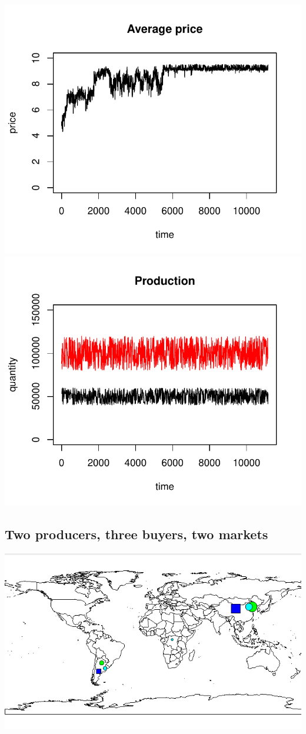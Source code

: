 \documentclass{article}
\begin{document}
\noindent
\vskip-5mm
\hskip-1cm
\includegraphics[scale=0.5]{fig_case07_price}
\includegraphics[scale=0.5]{fig_case07_production}

\newpage

\subsection{Two producers, three buyers, two markets}

\includegraphics[scale=0.6]{fig_2_2_3_map}
\end{document}

